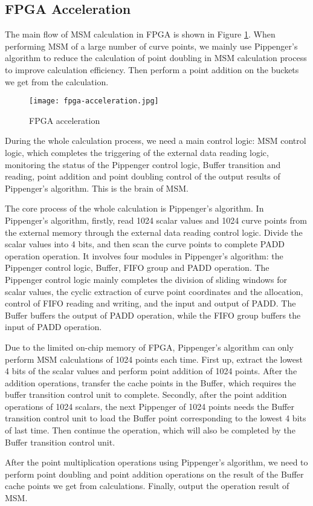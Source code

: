\subsection{FPGA Acceleration}

The main flow of MSM calculation in FPGA is shown in Figure \ref{fig:fpga-acceleration}. When performing MSM of a large number of curve points, we mainly use Pippenger's algorithm \cite{pip76} to reduce the calculation of point doubling in MSM calculation process to improve calculation efficiency. Then perform a point addition on the buckets we get from the calculation.

\begin{figure}[!ht]
    \centering
    \texttt{[image: fpga-acceleration.jpg]}
    \caption{FPGA acceleration}
    \label{fig:fpga-acceleration}
\end{figure}

During the whole calculation process, we need a main control logic: MSM control logic, which completes the triggering of the external data reading logic, monitoring the status of the Pippenger control logic, Buffer transition and reading, point addition and point doubling control of the output results of Pippenger's algorithm. This is the brain of MSM.

The core process of the whole calculation is Pippenger's algorithm. In Pippenger's algorithm, firstly, read 1024 scalar values and 1024 curve points from the external memory through the external data reading control logic. Divide the scalar values into 4 bits, and then scan the curve points to complete PADD operation operation. It involves four modules in Pippenger's algorithm: the Pippenger control logic, Buffer, FIFO group and PADD operation. The Pippenger control logic mainly completes the division of sliding windows for scalar values, the cyclic extraction of curve point coordinates and the allocation, control of FIFO reading and writing, and the input and output of PADD. The Buffer buffers the output of PADD operation, while the FIFO group buffers the input of PADD operation.

Due to the limited on-chip memory of FPGA, Pippenger's algorithm can only perform MSM calculations of 1024 points each time. First up, extract the lowest 4 bits of the scalar values and perform point addition of 1024 points. After the addition operations, transfer the cache points in the Buffer, which requires the buffer transition control unit to complete. Secondly, after the point addition operations of 1024 scalars, the next Pippenger of 1024 points needs the Buffer transition control unit to load the Buffer point corresponding to the lowest 4 bits of last time. Then continue the operation, which will also be completed by the Buffer transition control unit.

After the point multiplication operations using Pippenger's algorithm, we need to perform point doubling and point addition operations on the result of the Buffer cache points we get from calculations. Finally, output the operation result of MSM.
